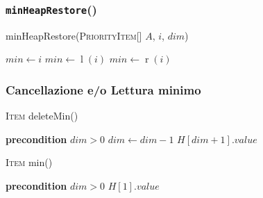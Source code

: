         \subsubsection{\texttt{minHeapRestore}()}
            \begin{algorithm}[H]
                \caption{minHeapRestore(\textsc{PriorityItem}[] $A$, \Int $i$, \Int $dim$)}
                \begin{algorithmic}
                    \State \Int $min \gets i$
                        \State \Int $min \gets \operatorname{l}(i)$
                    \EndIf
                        \State \Int $min \gets \operatorname{r}(i)$
                    \EndIf
                        \State {}
                        \State {}
                    \EndIf
                \end{algorithmic}
            \end{algorithm}
        \subsubsection{Cancellazione e/o Lettura minimo}
            \begin{algorithm}[H]
                \caption{\textsc{Item} deleteMin()}
                \begin{algorithmic}
                    \State \textbf{precondition} $dim > 0$
                    \State {}
                    \State $dim \gets dim-1$
                    \State {}
                    \State \Return $H[dim+1].value$
                \end{algorithmic}
            \end{algorithm}
            \begin{algorithm}[H]
                \caption{\textsc{Item} min()}
                \begin{algorithmic}
                    \State \textbf{precondition} $dim > 0$
                    \State \Return $H[1].value$
                \end{algorithmic}
            \end{algorithm}
